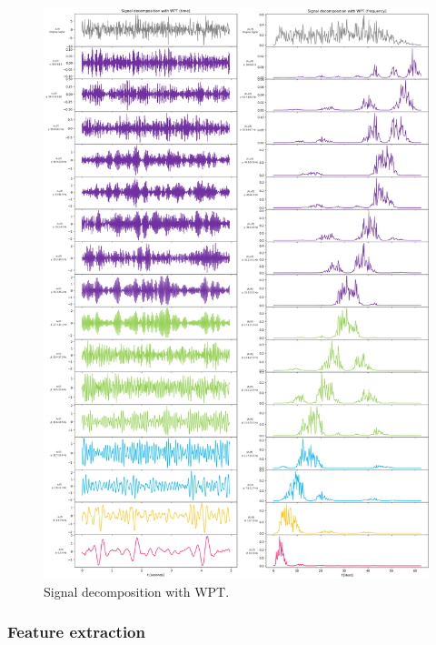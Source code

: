 \begin{figure}[H]
	\includegraphics[scale=0.3]{Figures/WPT_time_freq.png}
	\centering
	\caption{Signal decomposition with WPT.}
	\label{Fig: WPT_freq_time}
\end{figure}

\subsubsection{Feature extraction}

